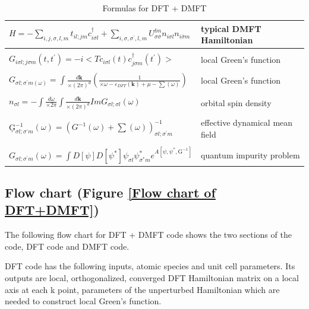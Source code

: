 \documentclass[12 pt]{article}
\begin{document}
  \begin{table}[ht]
    \centering
    \caption{Formulas for DFT + DMFT}
    \label{Formulas for DFT + DMFT}
    \vspace{2ex}

  \begin{tabular}{|l|l|}
    \hline
    $H=-\sum\limits_{i,j,\sigma,l,m}t_{il;jm}c_{i\sigma l}^{\dagger}+\sum\limits_{i,\sigma,\sigma^\prime,l,m}
U_{\sigma\overline{\sigma}}^{lm}n_{i\sigma l}n_{i\overline{\sigma}m}$ &  typical DMFT Hamiltonian  \\ \hline
    &\\
    $G_{i\sigma l;j\sigma m}(t, t^\prime)=-i <Tc_{i\sigma l}(t)c_{j\sigma m}^{\dagger}(t^\prime)>$ &  local Green's 
function \\ \hline
    &\\
    $G_{\sigma l;\sigma^\prime m(\omega)}=\int \frac{d\textbf{k}}{×(2\pi)^d}(\frac{1}{×\omega-\varepsilon_{DFT}
(\textbf{k})+\mu-\sum(\omega)})$ &  local Green's function \\ \hline
    &\\
    $n_{\sigma l}=-\int \frac{d\omega}{×2\pi} \int \frac{d\textbf{k}}{×(2\pi)^d}ImG_{\sigma l;\sigma l}(\omega)$ 
&  orbital spin density \\ \hline
    &\\
    \c{G}$_{\sigma l;\sigma^\prime m}^{-1}(\omega) = (G^{-1}(\omega)+\sum(\omega))_{\sigma l;\sigma^\prime m}^{-1}$ 
&  effective dynamical mean field \\ \hline
    &\\
    $G_{\sigma l;\sigma^\prime m}(\omega)=\int D[\psi]D[\psi^*]\psi_{\sigma l}\psi^*_{\sigma^{*}m} e^{A[\psi,\psi^*,
\text{\c{G}}^{-1}]}$ &  quantum impurity problem \\ \hline
 
  \end{tabular}

  \end{table}

  \cleardoublepage

      \subsection{Flow chart (Figure \ref{Flow chart of DFT+DMFT})}

  The following flow chart for DFT + DMFT code shows the two sections of the code, DFT code and DMFT code. 

  DFT code has the following inputs, atomic species and unit cell parameters. Its outputs are local, orthogonalized, 
converged DFT Hamiltonian matrix on a local axis at each k point, parameters of the unperturbed Hamiltonian which 
are needed to construct local Green's function.
\end{document}
